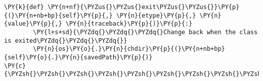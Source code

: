 \begin{Verbatim}[commandchars=\\\{\}]
    \PY{k}{def} \PY{n+nf}{\PYZus{}\PYZus{}exit\PYZus{}\PYZus{}}\PY{p}{(}\PY{n+nb+bp}{self}\PY{p}{,} \PY{n}{etype}\PY{p}{,} \PY{n}{value}\PY{p}{,} \PY{n}{traceback}\PY{p}{)}\PY{p}{:}
        \PY{l+s+sd}{\PYZdq{}\PYZdq{}\PYZdq{}Change back when the class is exited\PYZdq{}\PYZdq{}\PYZdq{}}
        \PY{n}{os}\PY{o}{.}\PY{n}{chdir}\PY{p}{(}\PY{n+nb+bp}{self}\PY{o}{.}\PY{n}{savedPath}\PY{p}{)}
\PY{c}{\PYZsh{}\PYZsh{}\PYZsh{}\PYZsh{}\PYZsh{}\PYZsh{}\PYZsh{}\PYZsh{}\PYZsh{}\PYZsh{}\PYZsh{}\PYZsh{}\PYZsh{}\PYZsh{}\PYZsh{}\PYZsh{}\PYZsh{}\PYZsh{}\PYZsh{}\PYZsh{}\PYZsh{}\PYZsh{}\PYZsh{}\PYZsh{}\PYZsh{}\PYZsh{}\PYZsh{}\PYZsh{}\PYZsh{}\PYZsh{}\PYZsh{}\PYZsh{}\PYZsh{}\PYZsh{}\PYZsh{}\PYZsh{}\PYZsh{}\PYZsh{}\PYZsh{}\PYZsh{}\PYZsh{}\PYZsh{}\PYZsh{}\PYZsh{}\PYZsh{}\PYZsh{}\PYZsh{}\PYZsh{}\PYZsh{}\PYZsh{}\PYZsh{}\PYZsh{}\PYZsh{}\PYZsh{}\PYZsh{}\PYZsh{}\PYZsh{}\PYZsh{}\PYZsh{}\PYZsh{}\PYZsh{}\PYZsh{}\PYZsh{}\PYZsh{}\PYZsh{}\PYZsh{}\PYZsh{}\PYZsh{}\PYZsh{}\PYZsh{}\PYZsh{}\PYZsh{}\PYZsh{}\PYZsh{}\PYZsh{}\PYZsh{}\PYZsh{}\PYZsh{}\PYZsh{}}
\end{Verbatim}
